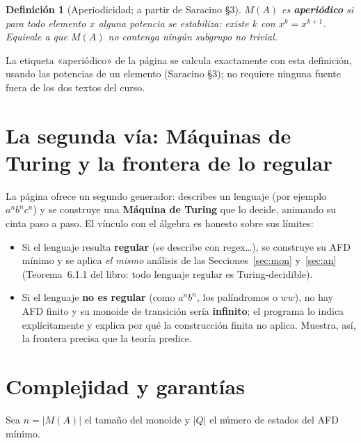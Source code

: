 \documentclass[11pt,a4paper]{article}
\theoremstyle{acc}
\newtheorem{definicion}{Definición}
\newcommand{\code}[1]{{\ttfamily #1}}
\begin{document}
\begin{definicion}[Aperiodicidad; a partir de Saracino §3]
$M(A)$ es \textbf{aperiódico} si para todo elemento $x$ alguna potencia se
estabiliza: existe $k$ con $x^{k}=x^{k+1}$. Equivale a que $M(A)$ no contenga
ningún subgrupo no trivial.
\end{definicion}
\noindent La etiqueta «aperiódico» de la página se calcula exactamente con esta
definición, usando las potencias de un elemento (Saracino §3); no requiere
ninguna fuente fuera de los dos textos del curso.

\section{La segunda vía: Máquinas de Turing y la frontera de lo regular}

La página ofrece un segundo generador: describes un lenguaje (por ejemplo
$a^nb^nc^n$) y se construye una \textbf{Máquina de Turing} que lo decide,
animando su cinta paso a paso. El vínculo con el álgebra es honesto sobre sus
límites:

\begin{itemize}
  \item Si el lenguaje resulta \textbf{regular} (se describe con \code{regex}\ldots),
        se construye su AFD mínimo y se aplica \emph{el mismo} análisis de las
        Secciones~\ref{sec:mon} y~\ref{sec:an} (Teorema~6.1.1 del libro: todo
        lenguaje regular es Turing-decidible).
  \item Si el lenguaje \textbf{no es regular} (como $a^nb^n$, los palíndromos o
        $ww$), no hay AFD finito y su monoide de transición sería
        \textbf{infinito}; el programa lo indica
        explícitamente y explica por qué la construcción finita no aplica. Muestra,
        así, la frontera precisa que la teoría predice.
\end{itemize}

\section{Complejidad y garantías}

Sea $n=|M(A)|$ el tamaño del monoide y $|Q|$ el número de estados del AFD mínimo.
\end{document}
